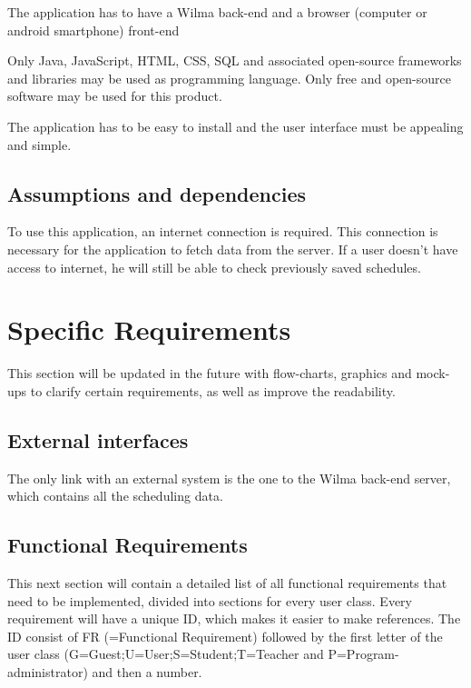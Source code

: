 \documentclass[9pt]{article}
\begin{document}
The application has to have a Wilma back-end and a browser (computer or
android smartphone) front-end

Only Java, JavaScript, HTML, CSS, SQL and associated open-source
frameworks and libraries may be used as programming language. Only free
and open-source software may be used for this product.

The application has to be easy to install and the user interface must be
appealing and simple.

\subsection{Assumptions and
dependencies}\label{assumptions-and-dependencies}

To use this application, an internet connection is required. This
connection is necessary for the application to fetch data from the
server. If a user doesn't have access to internet, he will still be able
to check previously saved schedules.

\section{Specific Requirements}\label{specific-requirements}

This section will be updated in the future with flow-charts, graphics
and mock-ups to clarify certain requirements, as well as improve the
readability.

\subsection{External interfaces}\label{external-interfaces}

The only link with an external system is the one to the Wilma back-end
server, which contains all the scheduling data.

\subsection{Functional
Requirements}\label{functional-requirements}

This next section will contain a detailed list of all functional
requirements that need to be implemented, divided into sections for
every user class. Every requirement will have a unique ID, which makes
it easier to make references. The ID consist of FR (=Functional
Requirement) followed by the first letter of the user class
(G=Guest;U=User;S=Student;T=Teacher and P=Program-administrator) and
then a number.
\end{document}
